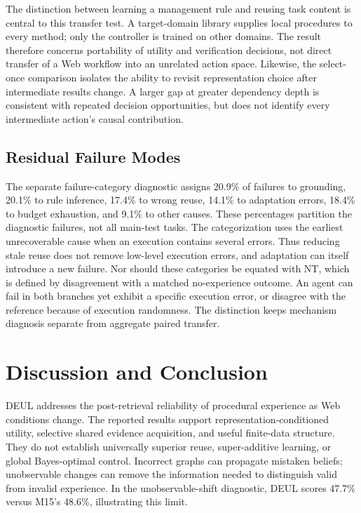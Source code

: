 \documentclass[sigconf,anonymous,review]{acmart}
\theoremstyle{zhplain}
\begin{document}
The distinction between learning a management rule and reusing task content is central to this transfer test. A target-domain library supplies local procedures to every method; only the controller is trained on other domains. The result therefore concerns portability of utility and verification decisions, not direct transfer of a Web workflow into an unrelated action space. Likewise, the select-once comparison isolates the ability to revisit representation choice after intermediate results change. A larger gap at greater dependency depth is consistent with repeated decision opportunities, but does not identify every intermediate action's causal contribution.

\subsection{Residual Failure Modes}
The separate failure-category diagnostic assigns 20.9\% of failures to grounding, 20.1\% to rule inference, 17.4\% to wrong reuse, 14.1\% to adaptation errors, 18.4\% to budget exhaustion, and 9.1\% to other causes. These percentages partition the diagnostic failures, not all main-test tasks. The categorization uses the earliest unrecoverable cause when an execution contains several errors. Thus reducing stale reuse does not remove low-level execution errors, and adaptation can itself introduce a new failure. Nor should these categories be equated with NT, which is defined by disagreement with a matched no-experience outcome. An agent can fail in both branches yet exhibit a specific execution error, or disagree with the reference because of execution randomness. The distinction keeps mechanism diagnosis separate from aggregate paired transfer.


\section{Discussion and Conclusion}
DEUL addresses the post-retrieval reliability of procedural experience as Web conditions change. The reported results support representation-conditioned utility, selective shared evidence acquisition, and useful finite-data structure. They do not establish universally superior reuse, super-additive learning, or global Bayes-optimal control. Incorrect graphs can propagate mistaken beliefs; unobservable changes can remove the information needed to distinguish valid from invalid experience. In the unobservable-shift diagnostic, DEUL scores 47.7\% versus M15's 48.6\%, illustrating this limit.
\end{document}
